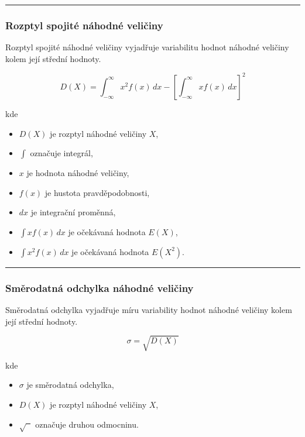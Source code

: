 \documentclass[a4paper, 11pt]{article}
\begin{document}
\noindent\hrule\medskip

\subsubsection{Rozptyl spojité náhodné veličiny}

Rozptyl spojité náhodné veličiny vyjadřuje variabilitu
hodnot náhodné veličiny kolem její střední hodnoty.

\begin{equation*}
	D(X)
	=
	\int_{-\infty}^{\infty} x^2 f(x)\,dx
	-
	\left[\int_{-\infty}^{\infty} x f(x)\,dx \right]^2
\end{equation*}

kde

\begin{itemize}[noitemsep]
	\item $D(X)$ je rozptyl náhodné veličiny $X$,
	\item $\int$ označuje integrál,
	\item $x$ je hodnota náhodné veličiny,
	\item $f(x)$ je hustota pravděpodobnosti,
	\item $dx$ je integrační proměnná,
	\item $\int x f(x)\,dx$ je očekávaná hodnota $E(X)$,
	\item $\int x^2 f(x)\,dx$ je očekávaná hodnota $E(X^2)$.
\end{itemize}

\noindent\hrule\medskip

\subsubsection{Směrodatná odchylka náhodné veličiny}

Směrodatná odchylka vyjadřuje míru variability
hodnot náhodné veličiny kolem její střední hodnoty.

\begin{equation*}
	\sigma = \sqrt{D(X)}
\end{equation*}

kde

\begin{itemize}[noitemsep]
	\item $\sigma$ je směrodatná odchylka,
	\item $D(X)$ je rozptyl náhodné veličiny $X$,
	\item $\sqrt{\phantom{x}}$ označuje druhou odmocninu.
\end{itemize}
\end{document}
